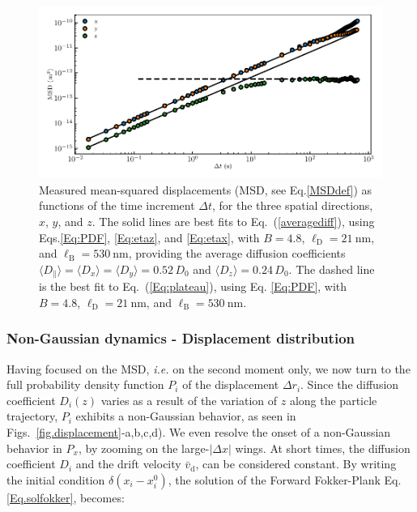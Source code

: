\begin{figure}[t!]
	\centering
	\includegraphics{02_body/chapter3/images/trajctory_analysis/msd.pdf}
	\caption{Measured mean-squared displacements (MSD, see Eq.\ref{MSDdef}) as functions of the time increment $\Delta t$, for the three spatial directions, $x$, $y$, and $z$. The solid lines are best fits to Eq.~(\ref{averagediff}), using Eqs.\ref{Eq:PDF}, \ref{Eq:etaz}, and \ref{Eq:etax}, with $B = 4.8$, $\ell_\mathrm{D} = 21 ~ \mathrm{nm}$, and $\ell_\mathrm{B} = 530~\mathrm{nm}$,
		providing the average diffusion coefficients $\langle{D_\parallel}\rangle= \langle D_x\rangle=\langle D_y \rangle =0.52\,D_0$ and $\langle D_z \rangle =0.24\, D_0$. The dashed line is the best fit to Eq.~(\ref{Eq:plateau}), using Eq. \ref{Eq:PDF}, with $B = 4.8$, $\ell_\mathrm{D} = 21 ~ \mathrm{nm}$, and $\ell_\mathrm{B} = 530~\mathrm{nm}$.}
	\label{fig.MSD}
\end{figure}


\subsubsection{Non-Gaussian dynamics - Displacement distribution}

Having focused on the \gls{MSD}, \textit{i.e.} on the second moment only, we now turn to the full probability density function $P_i$ of the displacement $\Delta r_i$. Since the diffusion coefficient $D_i(z)$ varies as a result of the variation of $z$ along the particle trajectory, $P_i$ exhibits a non-Gaussian behavior, as seen in Figs.~\ref{fig.displacement}-a,b,c,d). We even resolve the onset of a non-Gaussian behavior in $P_x$, by zooming on the large-$\lvert\Delta x\rvert$ wings. At short times, the diffusion coefficient $D_i$ and the drift velocity $\bar{v}_\mathrm{d}$, can be considered constant. By writing the initial condition $\delta(x_i - x_i ^0)$, the solution of the Forward Fokker-Plank Eq.\ref{Eq.solfokker}, becomes:

